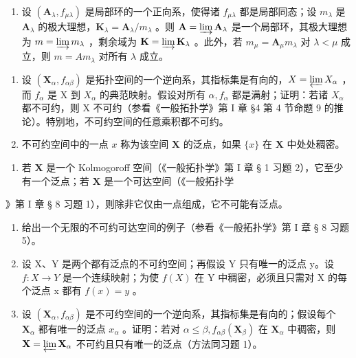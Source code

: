 \begin{enumerate}
\def\labelenumi{\arabic{enumi}.}
\setcounter{enumi}{15}
\tightlist
\item
  设 \((\mathbf{A}_{\lambda}, f_{\mu \lambda})\) 是局部环的一个正向系，使得诸 \(f_{\mu \lambda}\) 都是局部同态；设 \(m_{\lambda}\) 是 \(\mathbf{A}_{\lambda}\) 的极大理想，\(\mathbf{K}_{\lambda} = \mathbf{A}_{\lambda} / m_{\lambda}\) 。则 \(\mathbf{A} = \varinjlim \mathbf{A}_{\lambda}\) 是一个局部环，其极大理想为 \(m = \varinjlim m_{\lambda}\) ，剩余域为 \(\mathbf{K} = \varinjlim \mathbf{K}_{\lambda}\) 。此外，若 \(m_{\mu} = \mathbf{A}_{\mu} m_{\lambda}\) 对 \(\lambda < \mu\) 成立，则 \(m = Am_{\lambda}\) 对所有 \(\lambda\) 成立。
\end{enumerate}


\begin{enumerate}
\def\labelenumi{\arabic{enumi}.}
\item
  设 \((\mathbf{X}_{\alpha}, f_{\alpha\beta})\) 是拓扑空间的一个逆向系，其指标集是有向的，\(X = \varprojlim X_{\alpha}\) ，而 \(f_{\alpha}\) 是 X 到 \(X_{\alpha}\) 的典范映射。假设对所有 \(\alpha, f_{\alpha}\) 都是满射；证明：若诸 \(X_{\alpha}\) 都不可约，则 X 不可约（参看《一般拓扑学》第 I 章 §4 第 4 节命题 9 的推论）。特别地，不可约空间的任意乘积都不可约。
\item
  不可约空间中的一点 \(x\) 称为该空间 \(\mathbf{X}\) 的泛点，如果 \(\{x\}\) 在 \(\mathbf{X}\) 中处处稠密。
\end{enumerate}

\begin{enumerate}
\def\labelenumi{(\alph{enumi})}
\tightlist
\item
  若 \(\mathbf{X}\) 是一个 Kolmogoroff 空间（《一般拓扑学》第 I 章 § 1 习题 2），它至少有一个泛点；若 \(\mathbf{X}\) 是一个可达空间（《一般拓扑学
\end{enumerate}

》第 I 章 § 8 习题 1），则除非它仅由一点组成，它不可能有泛点。

\begin{enumerate}
\def\labelenumi{(\alph{enumi})}
\setcounter{enumi}{1}
\item
  给出一个无限的不可约可达空间的例子（参看《一般拓扑学》第 I 章 § 8 习题 5）。
\item
  设 X、Y 是两个都有泛点的不可约空间；再假设 Y 只有唯一的泛点 y。设 \(f: X \to Y\) 是一个连续映射；为使 \(f(X)\) 在 Y 中稠密，必须且只需对 X 的每个泛点 x 都有 \(f(x) = y\) 。
\item
  设 \((\mathbf{X}_{\alpha}, f_{\alpha \beta})\) 是不可约空间的一个逆向系，其指标集是有向的；假设每个 \(\mathbf{X}_{\alpha}\) 都有唯一的泛点 \(x_{\alpha}\) 。证明：若对 \(\alpha \leqslant \beta, f_{\alpha \beta}(\mathbf{X}_{\beta})\) 在 \(\mathbf{X}_{\alpha}\) 中稠密，则 \(\mathbf{X} = \varprojlim \mathbf{X}_{\alpha}\) 不可约且只有唯一的泛点（方法同习题 1）。
\end{enumerate}

